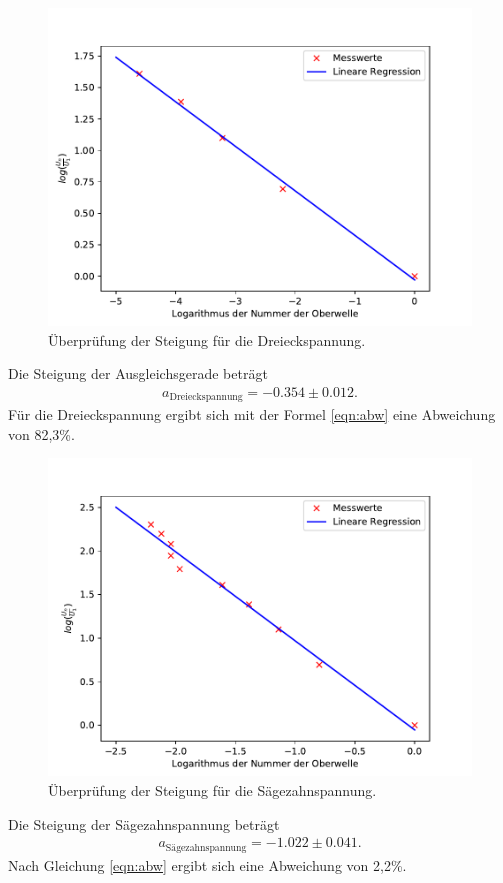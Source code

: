  \begin{figure}[H]
  \centering
  \includegraphics{plot2.pdf}
  \caption{Überprüfung der Steigung für die Dreieckspannung.}
  \label{fig:plot2}
\end{figure}
Die Steigung der Ausgleichsgerade beträgt
\begin{align*}
  a_{\text{Dreieckspannung}}= -0.354 \pm 0.012.
\end{align*}
Für die Dreieckspannung ergibt sich mit der Formel \eqref{eqn:abw} eine Abweichung von
82,3\%.
\begin{figure}[H]
  \centering
  \includegraphics{plot3.pdf}
  \caption{Überprüfung der Steigung für die Sägezahnspannung.}
  \label{fig:plot3}
\end{figure}
Die Steigung der Sägezahnspannung beträgt
\begin{align*}
  a_{\text{Sägezahnspannung}}= -1.022 \pm 0.041.
\end{align*}
Nach Gleichung \eqref{eqn:abw} ergibt sich eine Abweichung von 2,2\%.


